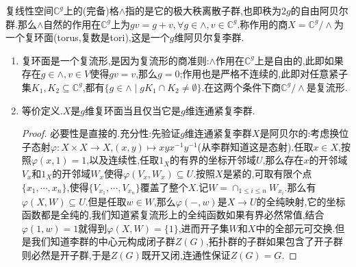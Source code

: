 复线性空间$\mathbb{C}^g$上的(完备)格$\wedge$指的是它的极大秩离散子群,也即秩为$2g$的自由阿贝尔群.那么$\wedge$自然的作用在$\mathbb{C}^g$上为$gv=g+v,\forall g\in\wedge,v\in\mathbb{C}^g$.称作用的商$X=\mathbb{C}^g/\wedge$为一个复环面(torus,复数是tori),这是一个$g$维阿贝尔复李群.
\begin{enumerate}
	\item 复环面是一个复流形,是因为复流形的商准则:$\wedge$作用在$\mathbb{C}^g$上是自由的,此即如果存在$g\in\wedge,v\in V$使得$gv=v$,那么$g=0$;作用也是严格不连续的,此即对任意紧子集$K_1,K_2\subseteq\mathbb{C}^g$,都有$\{g\in\wedge\mid gK_1\cap K_2\not=\emptyset\}$.在这两个条件下商$\mathbb{C}^g/\wedge$是复流形.
	\item 等价定义.$X$是$g$维复环面当且仅当它是$g$维连通紧复李群.
	\begin{proof}
		
		必要性是直接的.充分性:先验证$g$维连通紧复李群$X$是阿贝尔的:考虑换位子态射$\varphi:X\times X\to X$,$(x,y)\mapsto xyx^{-1}y^{-1}$(从李群知道这是态射).任取$x\in X$,按照$\varphi(x,1)=1$,以及连续性,任取$1_X$的有界的坐标开邻域$U$,那么存在$x$的开邻域$V_x$和$1_X$的开邻域$W_x$使得$\varphi(V_x,W_x)\subseteq U$.按照$X$是紧的,可取有限个点$\{x_1,\cdots,x_n\}$,使得$\{V_{x_1},\cdots,V_{x_n}\}$覆盖了整个$X$.记$W=\cap_{1\le i\le n}W_{x_i}$.那么有$\varphi(X,W)\subseteq U$.但是任取$w\in W$,那么$\varphi(-,w)$是$X\to U$的全纯映射,它的坐标函数都是全纯的,我们知道紧复流形上的全纯函数如果有界必然常值,结合$\varphi(1,w)=1$就得到$\varphi(X,W)=\{1\}$,进而开子集$W$和$X$中的全部元可交换.但是我们知道李群的中心元构成闭子群$Z(G)$,拓扑群的子群如果包含了开子群则必然是开子群,于是$Z(G)$既开又闭,连通性保证$Z(G)=G$.
		
		\qquad
		

\end{proof}
\end{enumerate}
